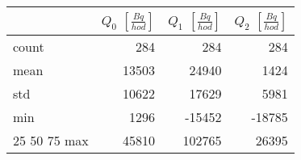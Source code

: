 \begin{tabular}{lrrr}
\toprule
{} &  $Q_0$ $\left[\si{\frac{Bq}{hod}}\right]$ &  $Q_1$ $\left[\si{\frac{Bq}{hod}}\right]$ &  $Q_2$ $\left[\si{\frac{Bq}{hod}}\right]$ \\
\midrule
count &                                       284 &                                       284 &                                       284 \\
mean  &                                     13503 &                                     24940 &                                      1424 \\
std   &                                     10622 &                                     17629 &                                      5981 \\
min   &                                      1296 &                                    -15452 &                                    -18785 \\
25%
50%
75%
max   &                                     45810 &                                    102765 &                                     26395 \\
\bottomrule
\end{tabular}
